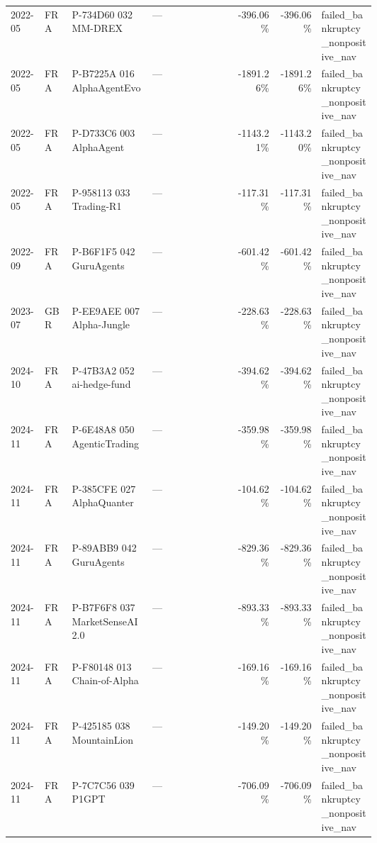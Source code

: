 \begin{longtable}{@{}llL{0.22\linewidth}L{0.23\linewidth}rrL{0.15\linewidth}@{}}
2022-05 & FRA & P-734D60 032 MM-DREX & --- & -396.06\% & -396.06\% & failed\_\allowbreak{}bankruptcy\_\allowbreak{}nonpositive\_\allowbreak{}nav \\
2022-05 & FRA & P-B7225A 016 AlphaAgentEvo & --- & -1891.26\% & -1891.26\% & failed\_\allowbreak{}bankruptcy\_\allowbreak{}nonpositive\_\allowbreak{}nav \\
2022-05 & FRA & P-D733C6 003 AlphaAgent & --- & -1143.21\% & -1143.20\% & failed\_\allowbreak{}bankruptcy\_\allowbreak{}nonpositive\_\allowbreak{}nav \\
2022-05 & FRA & P-958113 033 Trading-R1 & --- & -117.31\% & -117.31\% & failed\_\allowbreak{}bankruptcy\_\allowbreak{}nonpositive\_\allowbreak{}nav \\
2022-09 & FRA & P-B6F1F5 042 GuruAgents & --- & -601.42\% & -601.42\% & failed\_\allowbreak{}bankruptcy\_\allowbreak{}nonpositive\_\allowbreak{}nav \\
2023-07 & GBR & P-EE9AEE 007 Alpha-Jungle & --- & -228.63\% & -228.63\% & failed\_\allowbreak{}bankruptcy\_\allowbreak{}nonpositive\_\allowbreak{}nav \\
2024-10 & FRA & P-47B3A2 052 ai-hedge-fund & --- & -394.62\% & -394.62\% & failed\_\allowbreak{}bankruptcy\_\allowbreak{}nonpositive\_\allowbreak{}nav \\
2024-11 & FRA & P-6E48A8 050 AgenticTrading & --- & -359.98\% & -359.98\% & failed\_\allowbreak{}bankruptcy\_\allowbreak{}nonpositive\_\allowbreak{}nav \\
2024-11 & FRA & P-385CFE 027 AlphaQuanter & --- & -104.62\% & -104.62\% & failed\_\allowbreak{}bankruptcy\_\allowbreak{}nonpositive\_\allowbreak{}nav \\
2024-11 & FRA & P-89ABB9 042 GuruAgents & --- & -829.36\% & -829.36\% & failed\_\allowbreak{}bankruptcy\_\allowbreak{}nonpositive\_\allowbreak{}nav \\
2024-11 & FRA & P-B7F6F8 037 MarketSenseAI 2.0 & --- & -893.33\% & -893.33\% & failed\_\allowbreak{}bankruptcy\_\allowbreak{}nonpositive\_\allowbreak{}nav \\
2024-11 & FRA & P-F80148 013 Chain-of-Alpha & --- & -169.16\% & -169.16\% & failed\_\allowbreak{}bankruptcy\_\allowbreak{}nonpositive\_\allowbreak{}nav \\
2024-11 & FRA & P-425185 038 MountainLion & --- & -149.20\% & -149.20\% & failed\_\allowbreak{}bankruptcy\_\allowbreak{}nonpositive\_\allowbreak{}nav \\
2024-11 & FRA & P-7C7C56 039 P1GPT & --- & -706.09\% & -706.09\% & failed\_\allowbreak{}bankruptcy\_\allowbreak{}nonpositive\_\allowbreak{}nav \\

\end{longtable}
